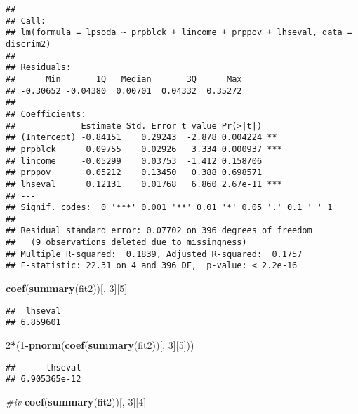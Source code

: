 \documentclass[
]{article}
\newenvironment{Shaded}{\begin{snugshade}}{\end{snugshade}}
\newcommand{\CommentTok}[1]{\textcolor[rgb]{0.56,0.35,0.01}{\textit{#1}}}
\newcommand{\DecValTok}[1]{\textcolor[rgb]{0.00,0.00,0.81}{#1}}
\newcommand{\KeywordTok}[1]{\textcolor[rgb]{0.13,0.29,0.53}{\textbf{#1}}}
\newcommand{\NormalTok}[1]{#1}
\newcommand{\OperatorTok}[1]{\textcolor[rgb]{0.81,0.36,0.00}{\textbf{#1}}}
\begin{document}
\begin{verbatim}
## 
## Call:
## lm(formula = lpsoda ~ prpblck + lincome + prppov + lhseval, data = discrim2)
## 
## Residuals:
##      Min       1Q   Median       3Q      Max 
## -0.30652 -0.04380  0.00701  0.04332  0.35272 
## 
## Coefficients:
##             Estimate Std. Error t value Pr(>|t|)    
## (Intercept) -0.84151    0.29243  -2.878 0.004224 ** 
## prpblck      0.09755    0.02926   3.334 0.000937 ***
## lincome     -0.05299    0.03753  -1.412 0.158706    
## prppov       0.05212    0.13450   0.388 0.698571    
## lhseval      0.12131    0.01768   6.860 2.67e-11 ***
## ---
## Signif. codes:  0 '***' 0.001 '**' 0.01 '*' 0.05 '.' 0.1 ' ' 1
## 
## Residual standard error: 0.07702 on 396 degrees of freedom
##   (9 observations deleted due to missingness)
## Multiple R-squared:  0.1839, Adjusted R-squared:  0.1757 
## F-statistic: 22.31 on 4 and 396 DF,  p-value: < 2.2e-16
\end{verbatim}

\begin{Shaded}
\begin{Highlighting}[]
\KeywordTok{coef}\NormalTok{(}\KeywordTok{summary}\NormalTok{(fit2))[, }\DecValTok{3}\NormalTok{][}\DecValTok{5}\NormalTok{]}
\end{Highlighting}
\end{Shaded}

\begin{verbatim}
##  lhseval 
## 6.859601
\end{verbatim}

\begin{Shaded}
\begin{Highlighting}[]
\DecValTok{2}\OperatorTok{*}\NormalTok{(}\DecValTok{1}\OperatorTok{-}\KeywordTok{pnorm}\NormalTok{(}\KeywordTok{coef}\NormalTok{(}\KeywordTok{summary}\NormalTok{(fit2))[, }\DecValTok{3}\NormalTok{][}\DecValTok{5}\NormalTok{]))}
\end{Highlighting}
\end{Shaded}

\begin{verbatim}
##      lhseval 
## 6.905365e-12
\end{verbatim}

\begin{Shaded}
\begin{Highlighting}[]
\CommentTok{#iv}
\KeywordTok{coef}\NormalTok{(}\KeywordTok{summary}\NormalTok{(fit2))[, }\DecValTok{3}\NormalTok{][}\DecValTok{4}\NormalTok{]}
\end{Highlighting}
\end{Shaded}
\end{document}
